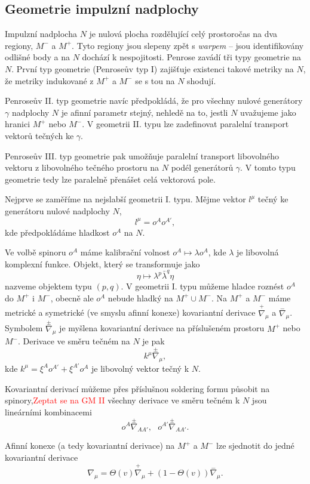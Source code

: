 \subsection{Geometrie impulzní nadplochy}

Impulzní nadplocha $N$ je nulová plocha rozdělující celý prostoročas na dva regiony, $M^-$ a $M^+$.
Tyto regiony jsou slepeny zpět s \emph{warpem} -- jsou identifikovány odlišné body a na $N$ dochází k
nespojitosti. Penrose zavádí tři typy geometrie na $N$.
První typ geometrie (Penroseův typ I) zajišťuje existenci takové metriky na $N$, že metriky indukované z $M^+$ a $M^-$
se s tou na $N$ shodují.

Penroseův II. typ geometrie navíc předpokládá, že pro všechny nulové generátory $\gamma$ nadplochy $N$
je afinní parametr stejný, nehledě na to, jestli $N$ uvažujeme jako hranici $M^+$ nebo $M^-$.
V geometrii II. typu lze zadefinovat paralelní transport vektorů tečných ke $\gamma$.

Penroseův III. typ geometrie pak umožňuje paralelní transport libovolného vektoru z libovolného tečného prostoru
na $N$ podél generátorů $\gamma$. V tomto typu geometrie tedy lze paralelně přenášet celá vektorová pole.

Nejprve se zaměříme na nejslabší geometrii I. typu. Mějme vektor $l^\mu$ tečný ke generátoru
nulové nadplochy $N$,
\begin{equation}
    l^\mu = o^A o^{A'},
\end{equation}
kde předpokládáme hladkost $o^A$ na $N$.

Ve volbě spinoru $o^A$ máme kalibrační volnost $o^A \mapsto \lambda o^A$, kde $\lambda$ je libovolná komplexní funkce.
Objekt, který se transformuje jako
\begin{equation}
    \eta \mapsto \lambda^p \bar{\lambda}^q \eta
\end{equation}
nazveme objektem typu $(p, q)$. V geometrii I. typu můžeme hladce roznést $o^A$ do
$M^+$ i $M^-$, obecně ale $o^A$ nebude hladký na $M^+ \cup M^-$. Na $M^+$ a $M^-$ máme
metrické a symetrické (ve smyslu afinní konexe) kovariantní derivace $\stackrel{+}{\nabla}_\mu$ a $\stackrel{-}{\nabla}_\mu$. Symbolem
$\stackrel{\pm}{\nabla}_\mu$ je myšlena kovariantní derivace na příslušeném prostoru $M^+$ nebo $M^-$.
Derivace ve směru tečném na $N$ je pak
\begin{equation}
    k^\mu \stackrel{\pm}{\nabla}_\mu,
\end{equation}
kde $k^\mu = \xi^A o^{A'} + \xi^{A'} o^A$ je libovolný vektor tečný k $N$.

Kovariantní derivací můžeme přes příslušnou soldering formu působit na spinory,\textcolor{red}{Zeptat se na GM II}
všechny derivace ve směru tečném k $N$ jsou lineárními kombinacemi
\begin{equation}
    o^A \stackrel{\pm}{\nabla}_{AA'}, ~~~ o^{A'} \stackrel{\pm}{\nabla}_{AA'}.
\end{equation}

Afinní konexe (a tedy kovariantní derivace) na $M^+$ a $M^-$ lze sjednotit do jedné kovariantní derivace
\begin{equation}
    \nabla_\mu = \Theta(v) \stackrel{+}{\nabla}_\mu + (1-\Theta(v)) \stackrel{-}{\nabla}_\mu.
\end{equation}

